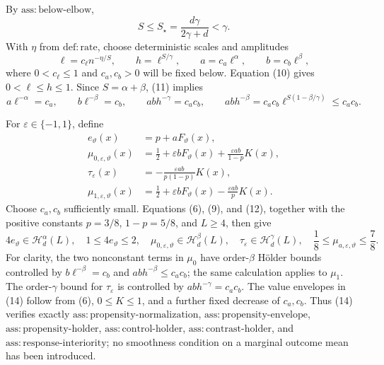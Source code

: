 By \(\mathrm{ass:below\mbox{-}elbow}\),
\[
 S\le S_\star=\frac{d\gamma}{2\gamma+d}<\gamma.               \tag{10}
\]
With \(\eta\) from \(\mathrm{def:rate}\), choose deterministic scales and amplitudes
\[
 \ell=c_\ell n^{-\eta/S},
 \qquad h=\ell^{S/\gamma},
 \qquad a=c_a\ell^\alpha,
 \qquad b=c_b\ell^\beta,                                      \tag{11}
\]
where \(0<c_\ell\le1\) and \(c_a,c_b>0\) will be fixed below.  Equation (10) gives \(0<\ell\le h\le1\).  Since \(S=\alpha+\beta\), (11) implies
\[
 a\ell^{-\alpha}=c_a,
 \qquad b\ell^{-\beta}=c_b,
 \qquad ab h^{-\gamma}=c_ac_b,
 \qquad ab h^{-\beta}
 =c_ac_b\ell^{S(1-\beta/\gamma)}\le c_ac_b.                    \tag{12}
\]

For \(\varepsilon\in\{-1,1\}\), define
\[
\begin{aligned}
 e_\vartheta(x)&=p+aF_\vartheta(x),\\
 \mu_{0,\varepsilon,\vartheta}(x)
 &=\frac12+\varepsilon bF_\vartheta(x)
   +\frac{\varepsilon ab}{1-p}K(x),\\
 \tau_\varepsilon(x)&=-\frac{\varepsilon ab}{p(1-p)}K(x),\\
 \mu_{1,\varepsilon,\vartheta}(x)
 &=\frac12+\varepsilon bF_\vartheta(x)
   -\frac{\varepsilon ab}{p}K(x).
                                                                    \tag{13}
\end{aligned}
\]
Choose \(c_a,c_b\) sufficiently small.  Equations (6), (9), and (12), together with the positive constants \(p=3/8\), \(1-p=5/8\), and \(L\ge4\), then give
\[
 4e_\vartheta\in\mathcal H_d^\alpha(L),
 \quad 1\le4e_\vartheta\le2,
 \quad \mu_{0,\varepsilon,\vartheta}\in\mathcal H_d^\beta(L),
 \quad \tau_\varepsilon\in\mathcal H_d^\gamma(L),
 \quad \frac18\le\mu_{a,\varepsilon,\vartheta}\le\frac78.   \tag{14}
\]
For clarity, the two nonconstant terms in \(\mu_0\) have order-\(\beta\) H\"older bounds controlled by \(b\ell^{-\beta}=c_b\) and \(ab h^{-\beta}\le c_ac_b\); the same calculation applies to \(\mu_1\).  The order-\(\gamma\) bound for \(\tau_\varepsilon\) is controlled by \(ab h^{-\gamma}=c_ac_b\).  The value envelopes in (14) follow from (6), \(0\le K\le1\), and a further fixed decrease of \(c_a,c_b\).  Thus (14) verifies exactly \(\mathrm{ass:propensity\mbox{-}normalization}\), \(\mathrm{ass:propensity\mbox{-}envelope}\), \(\mathrm{ass:propensity\mbox{-}holder}\), \(\mathrm{ass:control\mbox{-}holder}\), \(\mathrm{ass:contrast\mbox{-}holder}\), and \(\mathrm{ass:response\mbox{-}interiority}\); no smoothness condition on a marginal outcome mean has been introduced.

